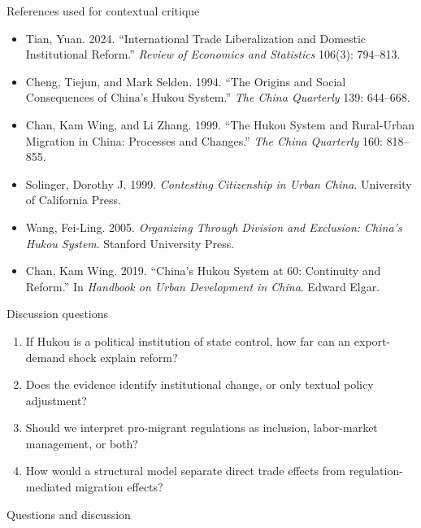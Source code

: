 \documentclass[10pt,aspectratio=169,t]{beamer}
\begin{document}
\begin{frame}{References used for contextual critique}
\footnotesize
\begin{itemize}
    \item Tian, Yuan. 2024. ``International Trade Liberalization and Domestic Institutional Reform.'' \emph{Review of Economics and Statistics} 106(3): 794--813.
    \item Cheng, Tiejun, and Mark Selden. 1994. ``The Origins and Social Consequences of China's Hukou System.'' \emph{The China Quarterly} 139: 644--668.
    \item Chan, Kam Wing, and Li Zhang. 1999. ``The Hukou System and Rural-Urban Migration in China: Processes and Changes.'' \emph{The China Quarterly} 160: 818--855.
    \item Solinger, Dorothy J. 1999. \emph{Contesting Citizenship in Urban China}. University of California Press.
    \item Wang, Fei-Ling. 2005. \emph{Organizing Through Division and Exclusion: China's Hukou System}. Stanford University Press.
    \item Chan, Kam Wing. 2019. ``China's Hukou System at 60: Continuity and Reform.'' In \emph{Handbook on Urban Development in China}. Edward Elgar.
\end{itemize}
\end{frame}

\begin{frame}{Discussion questions}
\begin{enumerate}
    \item If Hukou is a political institution of state control, how far can an export-demand shock explain reform?
    \item Does the evidence identify institutional change, or only textual policy adjustment?
    \item Should we interpret pro-migrant regulations as inclusion, labor-market management, or both?
    \item How would a structural model separate direct trade effects from regulation-mediated migration effects?
\end{enumerate}
\end{frame}

\begin{frame}[plain]
\centering
\vspace{2.5cm}
{\Large Questions and discussion}
\end{frame}
\end{document}
